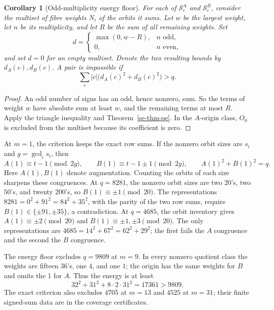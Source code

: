 \documentclass[11pt]{article}
\newtheorem{corollary}[theorem]{Corollary}
\theoremstyle{definition}
\theoremstyle{remark}
\begin{document}
\begin{corollary}[Odd-multiplicity energy floor]
\label{se-cor-floor}
For each of $\mathcal S^A_c$ and $\mathcal S^B_c$, consider the multiset
of fibre weights $N_i$ of the orbits it sums.  Let $w$ be the largest weight, let $n$ be its multiplicity,
and let $R$ be the sum of all remaining weights.  Set
\[
 d=\begin{cases}\max(0,w-R),&n\text{ odd},\\0,&n\text{ even},\end{cases}
\]
and set $d=0$ for an empty multiset.  Denote the two resulting bounds by
$d_A(c),d_B(c)$.  A pair is impossible if
\[
 \sum_c |c|\bigl(d_A(c)^2+d_B(c)^2\bigr)>q.
\]
\end{corollary}

\begin{proof}
An odd number of signs has an odd, hence nonzero, sum.  So the terms of
weight $w$ have absolute sum at least $w$, and the remaining terms at
most $R$.  Apply the triangle inequality and Theorem~\ref{se-thm-qe}.
In the $A$-origin class, $O_0$ is excluded from the multiset because its
coefficient is zero.
\end{proof}

At $m=1$, the criterion keeps the exact row sums.  If the nonzero orbit
sizes are $s_i$ and $g=\gcd_i s_i$, then
\begin{equation}
 A(1)\equiv t-1\pmod{2g},\qquad
 B(1)\equiv t-1\pm1\pmod{2g},\qquad A(1)^2+B(1)^2=q.
 \label{se-eq-augmentation}
\end{equation}
Here $A(1),B(1)$ denote augmentation.  Counting the orbits of each size
sharpens these congruences.  At $q=8281$, the nonzero orbit sizes are
two $20$'s, two $50$'s, and twenty $200$'s, so
$B(1)\equiv\pm1\pmod{20}$.  The representations
$8281=0^2+91^2=84^2+35^2$, with the parity of the two row sums, require
$B(1)\in\{\pm91,\pm35\}$, a contradiction.
At $q=4685$, the orbit inventory gives
$A(1)\equiv\pm2\pmod{20}$ and
$B(1)\equiv\pm1,\pm3\pmod{20}$.  The only representations are
$4685=14^2+67^2=62^2+29^2$; the first fails the $A$ congruence and the
second the $B$ congruence.

The energy floor excludes $q=9809$ at $m=9$.
In every nonzero quotient class the weights are fifteen $36$'s, one $4$,
and one $1$; the origin has the same weights for $B$ and omits the $1$
for $A$.  Thus the energy is at least
\[
 32^2+31^2+8\cdot2\cdot31^2=17361>9809.
\]
The exact criterion also excludes $4705$ at $m=13$ and $4525$ at $m=31$;
their finite signed-sum data are in the coverage certificates.
\end{document}
